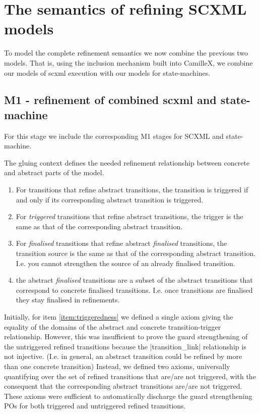 \section{The semantics of refining SCXML models}

To model the complete \SCXML refinement semantics we now combine the previous two models. 
That is, using the inclusion mechanism built into CamilleX, we combine our models of scxml execution with our models for state-machines.

\subsection{M1 - refinement of combined scxml and state-machine }
For this stage we include the corresponding M1 stages for SCXML and state-machine.

The gluing context defines the needed refinement relationship between concrete and abstract parts of the model.
\begin{enumerate}
	\item \label{item:triggeredness} For transitions that refine abstract transitions, the transition is triggered if and only if its corresponding abstract transition is triggered.
	\item For \emph{triggered} transitions that refine abstract transitions, the trigger is the same as that of the corresponding abstract transition.
	\item For \emph{finalised} transitions that refine abstract \emph{finalised} transitions, the transition source is the same as that of the corresponding abstract transition. I.e. you cannot strengthen the source of an already finalised transition.
	\item the abstract \emph{finalised} transitions are a subset of the abstract transitions that correspond to concrete finalised transitions. I.e. once transitions are finalised they stay finalised in refinements. 
\end{enumerate}
Initially, for item \ref{item:triggeredness} we defined a single axiom giving the equality of the domains of the abstract and concrete transition-trigger relationship.
However, this was insufficient to prove the guard strengthening of the untriggered refined transitions because the |transition_link| relationship is not injective.
(I.e. in general, an abstract transition could be refined by more than one concrete transition)
Instead, we defined two axioms, universally quantifying over the set of refined transitions that are/are not triggered, with the consequent that the corresponding abstract transitions are/are not triggered.
These axioms were sufficient to automatically discharge the guard strengthening POs for both triggered and untriggered refined transitions.

